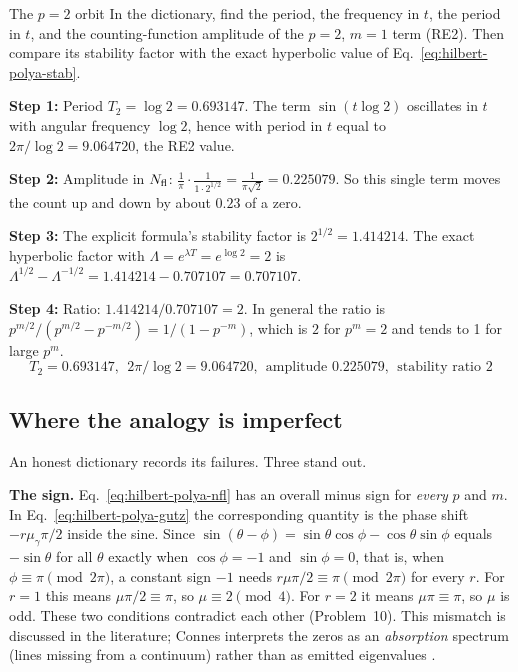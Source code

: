 \begin{sample}{The $p=2$ orbit}
In the dictionary, find the period, the frequency in $t$, the period in $t$, and the counting-function amplitude of the $p=2$, $m=1$ term (RE2). Then compare its stability factor with the exact hyperbolic value of Eq.~\eqref{eq:hilbert-polya-stab}.

\textbf{Step 1:} Period $T_2=\log2=0.693147$. The term $\sin(t\log2)$ oscillates in $t$ with angular frequency $\log 2$, hence with period in $t$ equal to $2\pi/\log2=9.064720$, the RE2 value.

\textbf{Step 2:} Amplitude in $N_{\mathrm{fl}}$: $\frac1\pi\cdot\frac{1}{1\cdot2^{1/2}}=\frac{1}{\pi\sqrt2}=0.225079$. So this single term moves the count up and down by about $0.23$ of a zero.

\textbf{Step 3:} The explicit formula's stability factor is $2^{1/2}=1.414214$. The exact hyperbolic factor with $\Lambda=e^{\lambda T}=e^{\log2}=2$ is $\Lambda^{1/2}-\Lambda^{-1/2}=1.414214-0.707107=0.707107$.

\textbf{Step 4:} Ratio: $1.414214/0.707107=2$. In general the ratio is $p^{m/2}/(p^{m/2}-p^{-m/2})=1/(1-p^{-m})$, which is $2$ for $p^m=2$ and tends to 1 for large $p^m$.
\[
\boxed{T_2=0.693147,\ \ 2\pi/\log2=9.064720,\ \ \text{amplitude }0.225079,\ \ \text{stability ratio }2}
\]
\end{sample}

\subsection{Where the analogy is imperfect}

An honest dictionary records its failures. Three stand out.

\textbf{The sign.} Eq.~\eqref{eq:hilbert-polya-nfl} has an overall minus sign for \emph{every} $p$ and $m$. In Eq.~\eqref{eq:hilbert-polya-gutz} the corresponding quantity is the phase shift $-r\mu_\gamma\pi/2$ inside the sine. Since $\sin(\theta-\phi)=\sin\theta\cos\phi-\cos\theta\sin\phi$ equals $-\sin\theta$ for all $\theta$ exactly when $\cos\phi=-1$ and $\sin\phi=0$, that is, when $\phi\equiv\pi\pmod{2\pi}$, a constant sign $-1$ needs $r\mu\pi/2\equiv\pi\pmod{2\pi}$ for every $r$. For $r=1$ this means $\mu\pi/2\equiv\pi$, so $\mu\equiv2\pmod4$. For $r=2$ it means $\mu\pi\equiv\pi$, so $\mu$ is odd. These two conditions contradict each other (Problem~10). This mismatch is discussed in the literature; Connes interprets the zeros as an \emph{absorption} spectrum (lines missing from a continuum) rather than as emitted eigenvalues \cite{connes}.

